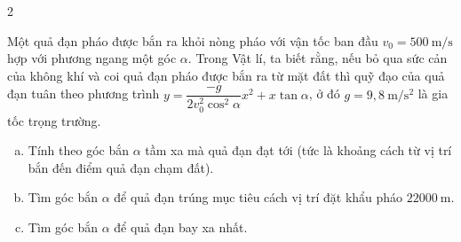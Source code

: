 \begin{bt}
\begin{bt}
\begin{multicols}{2}
\begin{enumerate}
		\end{enumerate}
	\end{multicols}
\end{bt}
\begin{bt}%
	Một quả đạn pháo được bắn ra khỏi nòng pháo với vận tốc ban đầu $v_0=500 ~\mathrm{m} / \mathrm{s}$ hợp với phương ngang một góc $\alpha$. Trong Vật lí, ta biết rằng, nếu bỏ qua sức cản của không khí và coi quả đạn pháo được bắn ra từ mặt đất thì quỹ đạo của quả đạn tuân theo phương trình $y=\dfrac{-g}{2 v_0^2 \cos ^2 \alpha} x^2+x \tan \alpha$, ở đó $g=9{,}8 \mathrm{~m} / \mathrm{s}^2$ là gia tốc trọng trường.
	\begin{enumerate}[a)]
		\item Tính theo góc bắn $\alpha$ tầm xa mà quả đạn đạt tới (tức là khoảng cách từ vị trí bắn đến điểm quả đạn chạm đất).
		\item Tìm góc bắn $\alpha$ để quả đạn trúng mục tiêu cách vị trí đặt khẩu pháo $22000 \mathrm{~m}$.
		\item Tìm góc bắn $\alpha$ để quả đạn bay xa nhất.\end{enumerate}
\end{bt}
\end{bt}
